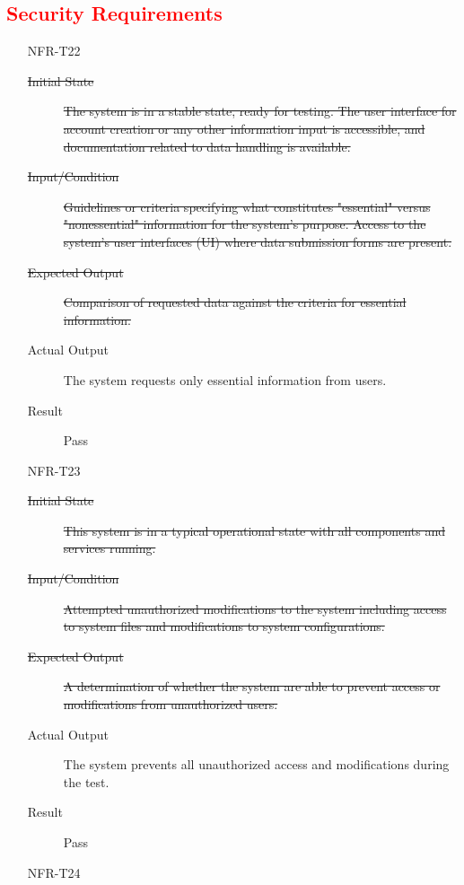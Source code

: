 \documentclass[12pt, titlepage]{article}
\newcommand{\rt}[1]{\textcolor{red}{#1}}
\begin{document}
  \rt{ \subsection{Security Requirements} }
  \begin{enumerate}
    \item[NFR-T22] \label{NFRT22}
      \begin{description}
      \item[\sout{Initial State}]\sout{ The system is in a stable state, ready for testing. The
        user interface for account creation or any other information input is
        accessible, and documentation related to data handling is available.
      }
      \item[\sout{Input/Condition}]\sout{ Guidelines or criteria specifying what constitutes
        "essential" versus "nonessential" information for the system’s purpose.
        Access to the system's user interfaces (UI) where data submission forms
        are present.
      }
      \item[\sout{Expected Output}]\sout{ Comparison of requested data against the criteria for
        essential information.
      }
      \item[Actual Output] The system requests only essential information from users.
      \item[Result] Pass
      \end{description}
    \item[NFR-T23] \label{NFRT23}
      \begin{description}
      \item[\sout{Initial State}]\sout{ This system is in a typical operational state with all
        components and services running.
      }
      \item[\sout{Input/Condition}]\sout{ Attempted unauthorized modifications to the system
        including access to system files and modifications to system
        configurations.
      }
      \item[\sout{Expected Output}]\sout{ A determination of whether the system are able to
        prevent access or modifications from unauthorized users.
      }
      \item[Actual Output] The system prevents all unauthorized access and
        modifications during the test.
      \item[Result] Pass
      \end{description}
    \item[NFR-T24] \label{NFRT24}
      \begin{description}

\end{description}
\end{enumerate}
\end{document}
